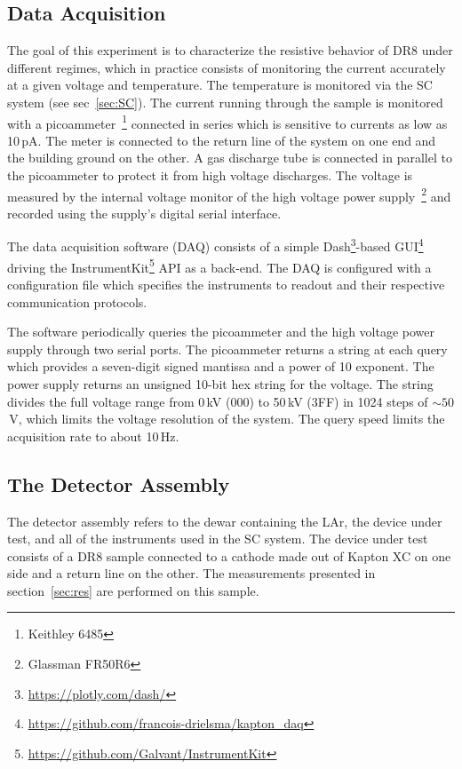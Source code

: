 \documentclass[a4paper,12pt]{article}
\newcommand{\DR}{DR8}
\begin{document}
\subsection{Data Acquisition}
\label{sec:DAQ}

The goal of this experiment is to characterize the resistive behavior of {\DR} under different regimes, which in practice consists of monitoring the current accurately at a given voltage and temperature. The temperature is monitored via the SC system (see sec~\ref{sec:SC}). The current running through the sample is monitored with a picoammeter~\footnote{Keithley 6485} connected in series which is sensitive to currents as low as 10\,pA. The meter is connected to the return line of the system on one end and the building ground on the other. A gas discharge tube is connected in parallel to the picoammeter to protect it from high voltage discharges. The voltage is measured by the internal voltage monitor of the high voltage power supply~\footnote{Glassman FR50R6} and recorded using the supply's digital serial interface.

The data acquisition software (DAQ) consists of a simple Dash\footnote{\href{https://plotly.com/dash/}{https://plotly.com/dash/}}-based GUI\footnote{\href{https://github.com/francois-drielsma/kapton_daq}{https://github.com/francois-drielsma/kapton\_daq}} driving the InstrumentKit\footnote{\href{https://github.com/Galvant/InstrumentKit}{https://github.com/Galvant/InstrumentKit}} API as a back-end. The DAQ is configured with a configuration file which specifies the instruments to readout and their respective communication protocols.

The software periodically queries the picoammeter and the high voltage power supply through two serial ports. The picoammeter returns a string at each query which provides a seven-digit signed mantissa and a power of 10 exponent. The power supply returns an unsigned 10-bit hex string for the voltage. The string divides the full voltage range from 0\,kV (000) to 50\,kV (3FF) in 1024 steps of $\sim50$\,V, which limits the voltage resolution of the system. The query speed limits the acquisition rate to about 10\,Hz.

\subsection{The Detector Assembly}
\label{sec:det_ass}
The detector assembly refers to the dewar containing the LAr, the device under test, and all of the instruments used in the SC system. The device under test consists of a {\DR} sample connected to a cathode made out of Kapton XC on one side and a return line on the other. The measurements presented in section~\ref{sec:res} are performed on this sample.
\end{document}

